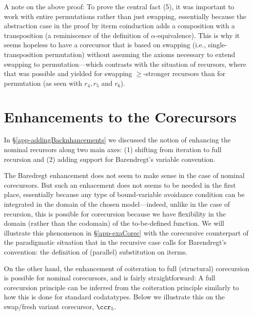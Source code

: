\medskip
A note on the above proof: To prove the central fact (5), it was %
important to work with entire permutations rather than just swapping, essentially because the abstraction case in the proof by iterm coinduction adds a composition with a transposition (a reminiscence of the definition of $\alpha$-equivalence). This is why it seems hopeless to have a corecursor that is based on swapping (i.e., single-transposition permutation) without assuming the axioms necessary to extend swapping to permutation---which contrasts with the situation of recursors, where that was possible and yielded for swapping $\geq$-stronger recursors than for permutation (as seen with $r_4,r_5$ and $r_6$).  


\section{Enhancements to the Corecursors} 
\label{app-enhCorec}

In \S\ref{app-addingBacknhancements} we discussed the notion of enhancing the nominal recursors along two main axes: (1) shifting from iteration to full recursion and (2) adding support for Barendregt's variable convention. 

The Baredregt enhancement does not seem to make sense in the case of nominal corecursors. But such an enhacement does not seems to be needed in the first place, essentially because any type of bound-variable avoidance condition can be integrated in the domain of the chosen model---indeed, unlike in the case of recursion, this is possible for corecursion because we have flexibility in the domain (rather than the codomain) of the to-be-defined function. We will illustrate this phenomenon in \S\ref{app-exaCorec} with the corecursive counterpart of the  paradigmatic situation that in the recursive case calls for Barendregt's convention: the definition of (parallel) substitution on iterms. 

\medskip
On the other hand, the enhancement of coiteration to full (structural) corecursion is possible for nominal corecursors, and is fairly straightforward: A full corecursion principle can be inferred from the coiteration principle similarly to how this is done for standard codatatypes. Below we illustrate this on the swap/fresh variant corecursor, $\ccr_5$. 

